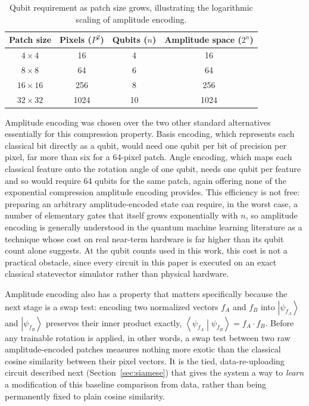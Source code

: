 \documentclass[conference]{IEEEtran}
\newcommand{\ket}[1]{\left|#1\right\rangle}
\newcommand{\braket}[2]{\left\langle#1\middle|#2\right\rangle}
\begin{document}
\begin{table}[t]
\centering
\caption{Qubit requirement as patch size grows, illustrating the logarithmic scaling of amplitude encoding.}
\label{tab:qubits}
\begin{tabular}{cccc}
\toprule
\textbf{Patch size} & \textbf{Pixels ($P^2$)} & \textbf{Qubits ($n$)} & \textbf{Amplitude space ($2^n$)}\\
\midrule
$4\times4$ & 16 & 4 & 16\\
$8\times8$ & 64 & 6 & 64\\
$16\times16$ & 256 & 8 & 256\\
$32\times32$ & 1024 & 10 & 1024\\
\bottomrule
\end{tabular}
\end{table}

Amplitude encoding was chosen over the two other standard alternatives essentially for this compression property. Basis encoding, which represents each classical bit directly as a qubit, would need one qubit per bit of precision per pixel, far more than six for a 64-pixel patch. Angle encoding, which maps each classical feature onto the rotation angle of one qubit, needs one qubit per feature and so would require 64 qubits for the same patch, again offering none of the exponential compression amplitude encoding provides. This efficiency is not free: preparing an arbitrary amplitude-encoded state can require, in the worst case, a number of elementary gates that itself grows exponentially with $n$, so amplitude encoding is generally understood in the quantum machine learning literature as a technique whose cost on real near-term hardware is far higher than its qubit count alone suggests. At the qubit counts used in this work, this cost is not a practical obstacle, since every circuit in this paper is executed on an exact classical statevector simulator rather than physical hardware.

Amplitude encoding also has a property that matters specifically because the next stage is a swap test: encoding two normalized vectors $f_A$ and $f_B$ into $\ket{\psi_{f_A}}$ and $\ket{\psi_{f_B}}$ preserves their inner product exactly, $\braket{\psi_{f_A}}{\psi_{f_B}} = f_A\cdot f_B$. Before any trainable rotation is applied, in other words, a swap test between two raw amplitude-encoded patches measures nothing more exotic than the classical cosine similarity between their pixel vectors. It is the tied, data-re-uploading circuit described next (Section~\ref{sec:siamese}) that gives the system a way to \emph{learn} a modification of this baseline comparison from data, rather than being permanently fixed to plain cosine similarity.
\end{document}
